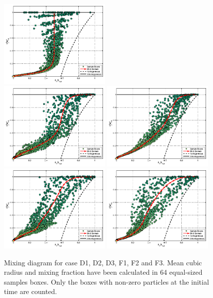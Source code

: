 \documentclass[draft,jgrga]{AGUTeX}
\begin{document}
\begin{article}
\begin{figure}
\includegraphics[width=0.48\textwidth]{Figures/mixing_casef1}\\
\includegraphics[width=0.48\textwidth]{Figures/mixing_cased2}
\includegraphics[width=0.48\textwidth]{Figures/mixing_casef2}\\
\includegraphics[width=0.48\textwidth]{Figures/mixing_cased3}
\includegraphics[width=0.48\textwidth]{Figures/mixing_casef3}
\caption{Mixing diagram for case D1, D2, D3, F1, F2 and F3. Mean cubic radius and mixing fraction have been calculated in 64 equal-sized samples boxes. Only the boxes with non-zero particles at the initial time are counted.\label{fig:mixing_diagram}}
\end{figure}


\end{article}
\end{document}
